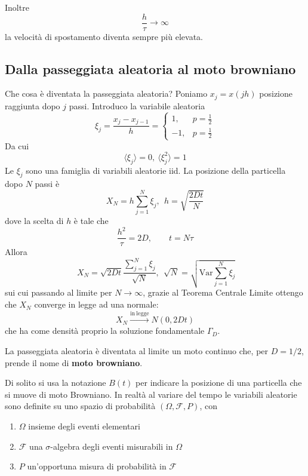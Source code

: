 \documentclass[10pt,a4paper,twoside,openright]{book}
\begin{document}
Inoltre 
\begin{equation*}
\frac{h}{\tau }\rightarrow \infty 
\end{equation*}
la velocità di spostamento diventa sempre più elevata.
\subsection{Dalla passeggiata aleatoria al moto browniano}

Che cosa è diventata la passeggiata aleatoria? Poniamo $\displaystyle x_{j} =x(jh)$ posizione raggiunta dopo $\displaystyle j$ passi. Introduco la variabile aleatoria
\begin{equation*}
\xi _{j} =\frac{x_{j} -x_{j-1}}{h} =\begin{cases}
1, & p=\frac{1}{2}\\
-1, & p=\frac{1}{2}
\end{cases}
\end{equation*}
Da cui
\begin{equation*}
\langle \xi _{j} \rangle =0,\ \langle \xi ^{2}_{j} \rangle =1
\end{equation*}
Le $\displaystyle \xi _{j}$ sono una famiglia di variabili aleatorie iid. La posizione della particella dopo $\displaystyle N$ passi è 
\begin{equation*}
X_{N} =h\sum ^{N}_{j=1} \xi _{j},\ \ h=\sqrt{\frac{2Dt}{N}}
\end{equation*}
dove la scelta di $\displaystyle h$ è tale che 
\begin{equation*}
\frac{h^{2}}{\tau } =2D,\qquad t=N\tau
\end{equation*}
Allora
\begin{equation*}
\ X_{N} =\sqrt{2Dt}\frac{\sum\nolimits ^{N}_{j=1} \xi _{j}}{\sqrt{N}},\ \ \sqrt{N} =\sqrt{\mathrm{Var}\sum ^{N}_{j=1} \xi _{j}}
\end{equation*}
sui cui passando al limite per $\displaystyle N\rightarrow \infty $, grazie al Teorema Centrale Limite ottengo che $\displaystyle X_{N}$ converge in legge ad una normale:
\begin{equation*}
X_{N}\xrightarrow{\mathrm{in\ legge}} N(0,2Dt)
\end{equation*}
che ha come densità proprio la soluzione fondamentale $\displaystyle \Gamma _{D}$.

La passeggiata aleatoria è diventata al limite un moto continuo che, per $\displaystyle D=1/2$, prende il nome di \textbf{moto browniano}.

Di solito si usa la notazione $\displaystyle B(t)$ per indicare la posizione di una particella che si muove di moto Browniano. In realtà al variare del tempo le variabili aleatorie sono definite su uno spazio di probabilità $\displaystyle ( \Omega,\mathcal{F},P)$, con 
\begin{enumerate}
\item $\displaystyle \Omega $ insieme degli eventi elementari
\item $\displaystyle \mathcal{F}$ una $\displaystyle \sigma $-algebra degli eventi misurabili in $\displaystyle \Omega $
\item $\displaystyle P$ un'opportuna misura di probabilità in $\displaystyle \mathcal{F}$
\end{enumerate}
\end{document}
